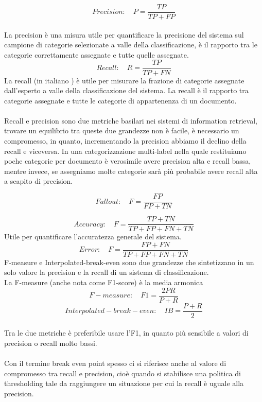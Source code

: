 \documentclass{article}
\theoremstyle{plain}
\theoremstyle{definition}
\begin{document}
\[ Precision: \quad P= \frac{TP}{TP+FP} \]
\\
La precision è una misura utile per quantificare la precisione del sistema sul campione di categorie selezionate a valle della classificazione, è il rapporto tra le categorie correttamente assegnate e tutte quelle assegnate.
\[ Recall: \quad R= \frac{TP}{TP+FN} \]
La recall (in italiano ) è utile per misurare la frazione di categorie assegnate dall'esperto a valle della classificazione del sistema. La recall è il rapporto tra categorie assegnate e tutte le categorie di appartenenza di un documento. 
\\
\\
Recall e precision sono due metriche basilari nei sistemi di information retrieval, trovare un equilibrio tra queste due grandezze non è facile, è necessario un compromesso, in quanto, incrementando la precision abbiamo il declino della recall e viceversa. In una categorizzazione multi-label nella quale restituiamo poche categorie per documento è verosimile avere precision alta e recall bassa, mentre invece, se assegniamo molte categorie sarà più probabile avere recall alta a scapito di precision.


\[ Fallout: \quad F= \frac{FP}{FP+TN} \]

\[ Accuracy: \quad F= \frac{TP+TN}{TP+FP+FN+TN} \]
Utile per quantificare l'accuratezza generale del sistema.
\[ Error: \quad F= \frac{FP+FN}{TP+FP+FN+TN} \]
F-measure e Interpolated-break-even sono due grandezze che sintetizzano in un solo valore la precision e la recall di un sistema di classificazione.
\\
La F-measure (anche nota come F1-score) è la media armonica 
\[ F-measure: \quad F1= \frac{2PR}{P+R} \]
\[ Interpolated-break-even: \quad IB= \frac{P+R}{2} \]
\\
Tra le due metriche è preferibile usare l'F1, in quanto più sensibile a valori di precision o recall molto bassi.
\\
\\
Con il termine break even point spesso ci si riferisce anche al valore di compromesso tra recall e precision, cioè quando si stabilisce una politica di thresholding tale da raggiungere un situazione per cui la recall è uguale alla precision. 
\newpage
\end{document}
